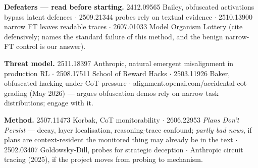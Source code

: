 \documentclass[11pt,a4paper]{article}
\begin{document}
\textbf{Defeaters --- read before starting.} 2412.09565 Bailey, obfuscated activations bypass
latent defences $\cdot$ 2509.21344 probes rely on textual evidence $\cdot$ 2510.13900 narrow FT
leaves readable traces $\cdot$ 2607.01033 Model Organism Lottery (cite defensively; names the
standard failure of this method, and the benign narrow-FT control is our answer).

\textbf{Threat model.} 2511.18397 Anthropic, natural emergent misalignment in production RL
$\cdot$ 2508.17511 School of Reward Hacks $\cdot$ 2503.11926 Baker, obfuscated hacking under CoT
pressure $\cdot$ alignment.openai.com/accidental-cot-grading (May 2026) --- argues obfuscation
demos rely on narrow task distributions; engage with it.

\textbf{Method.} 2507.11473 Korbak, CoT monitorability $\cdot$ 2606.22953 \emph{Plans Don't
Persist} --- decay, layer localisation, reasoning-trace confound; \emph{partly bad news}, if plans
are context-resident the monitored thing may already be in the text $\cdot$ 2502.03407
Goldowsky-Dill, probes for strategic deception $\cdot$ Anthropic circuit tracing (2025), if the
project moves from probing to mechanism.
\end{document}
